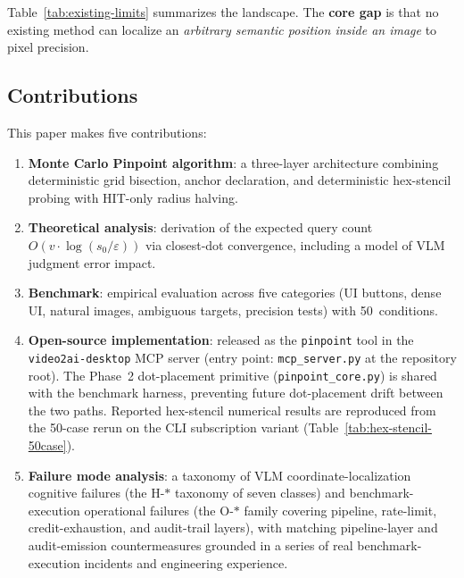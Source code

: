 \documentclass[sigconf,nonacm]{acmart}
\begin{document}
Table~\ref{tab:existing-limits} summarizes the landscape.  The
\textbf{core gap} is that no existing method can localize an
\emph{arbitrary semantic position inside an image} to pixel precision.

\subsection{Contributions}

This paper makes five contributions:

\begin{enumerate}
  \item \textbf{Monte Carlo Pinpoint algorithm}: a three-layer
    architecture combining deterministic grid bisection, anchor
    declaration, and deterministic hex-stencil probing with HIT-only
    radius halving.
  \item \textbf{Theoretical analysis}: derivation of the expected
    query count $O(v \cdot \log(s_0/\varepsilon))$ via closest-dot
    convergence, including a model of VLM judgment error impact.
  \item \textbf{Benchmark}: empirical evaluation across five categories
    (UI buttons, dense UI, natural images, ambiguous targets,
    precision tests) with 50~conditions.
  \item \textbf{Open-source implementation}: released as the
    \texttt{pinpoint} tool in the \texttt{video2ai-desktop} MCP server
    (entry point: \texttt{mcp\_server.py} at the repository root).
    The Phase~2 dot-placement primitive (\texttt{pinpoint\_core.py})
    is shared with the benchmark harness, preventing future
    dot-placement drift between the two paths.  Reported hex-stencil
    numerical results are reproduced from the 50-case rerun on the
    CLI subscription variant (Table~\ref{tab:hex-stencil-50case}).
  \item \textbf{Failure mode analysis}: a taxonomy of VLM
    coordinate-localization cognitive failures (the H-$\ast$
    taxonomy of seven classes) and benchmark-execution
    operational failures (the O-$\ast$ family covering pipeline,
    rate-limit, credit-exhaustion, and audit-trail layers), with
    matching pipeline-layer and audit-emission countermeasures
    grounded in a series of real benchmark-execution incidents
    and engineering experience.
\end{enumerate}


\end{document}

